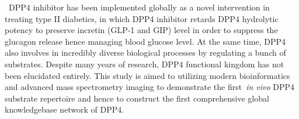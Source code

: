 \ DPP4 inhibitor has been implemented globally as a novel intervention in treating type II diabetics, in which DPP4 inhibitor retards DPP4 hydrolytic potency to preserve incretin (GLP-1 and GIP) level in order to suppress the glucagon release hence managing blood glucose level. At the same time, DPP4 also involves in incredibly diverse biological processes by regulating a bunch of substrates. Despite many years of research, DPP4 functional kingdom has not been elucidated entirely. This study is aimed to utilizing modern bioinformatics and advanced mass spectrometry imaging to demonstrate the first~\textit{in vivo}  DPP4 substrate repertoire and hence to construct the first comprehensive global knowledgebase network of DPP4. \\